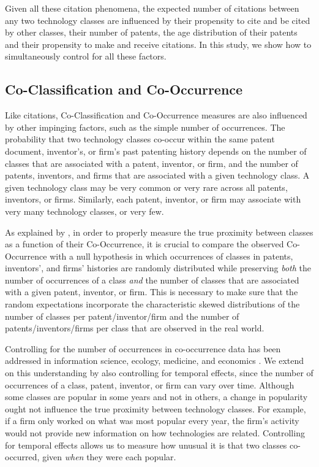 \documentclass[]{svjour3}
\begin{document}
Given all these citation phenomena, the expected number of citations between any two technology classes are influenced by their propensity to cite and be cited by other classes, their number of patents, the age distribution of their patents and their propensity to make and receive citations. In this study, we show how to simultaneously control for all these factors.

\subsection{Co-Classification and Co-Occurrence}
Like citations, Co-Classification and Co-Occurrence measures are also influenced by other impinging factors, such as the simple number of occurrences. The probability that two technology classes co-occur within the same patent document, inventor's, or firm's past patenting history depends on the number of classes that are associated with a patent, inventor, or firm, and the number of patents, inventors, and firms that are associated with a given technology class. A given technology class may be very common or very rare across all patents, inventors, or firms. Similarly, each patent, inventor, or firm may associate with very many technology classes, or very few. 

As explained by \citet{Bottazzi2010}, in order to properly measure the true proximity between classes as a function of their Co-Occurrence, it is crucial to compare the observed Co-Occurrence with a null hypothesis in which occurrences of classes in patents, inventors', and firms' histories are randomly distributed while preserving \textit{both} the number of occurrences of a class \textit{and} the number of classes that are associated with a given patent, inventor, or firm. This is necessary to make sure that the random expectations incorporate the characteristic skewed distributions of the number of classes per patent/inventor/firm and the number of patents/inventors/firms per class that are observed in the real world.

Controlling for the number of occurrences in co-occurrence data has been addressed in information science, ecology, medicine, and economics \citep{Eck2009,Ulrich2007,Stone1990,Gobbi2014,Neffke2008}.
We extend on this understanding by also controlling for temporal effects, since the number of occurrences of a class, patent, inventor, or firm can vary over time. Although some classes are popular in some years and not in others, a change in popularity ought not influence the true proximity between technology classes. For example, if a firm only worked on what was most popular every year, the firm's activity would not provide new information on how technologies are related. Controlling for temporal effects allows us to measure how unusual it is that two classes co-occurred, given \textit{when} they were each popular.
\end{document}
